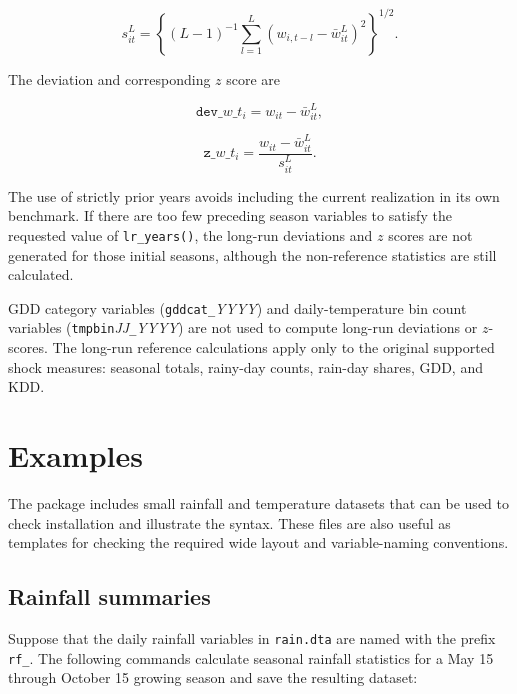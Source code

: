 \begin{equation}
	s_{it}^{L} = \left\{(L - 1)^{-1} \sum_{l = 1}^{L} \left(w_{i, t - l} - \bar{w}_{it}^{L} \right)^2 \right\}^{1 / 2} .
\end{equation}

The deviation and corresponding $z$ score are

\begin{equation}
	\texttt{dev\_} w\texttt{\_} t_i = w_{it} - \bar{w}_{it}^{L} ,
\end{equation}

\begin{equation}
	\texttt{z\_} w\texttt{\_} t_i = \frac{w_{it} - \bar{w}_{it}^{L}}{s_{it}^{L}} .
\end{equation}

\noindent The use of strictly prior years avoids including the current realization in its own benchmark. If there are too few preceding season variables to satisfy the requested value of \texttt{lr\_years()}, the long-run deviations and $z$ scores are not generated for those initial seasons, although the non-reference statistics are still calculated.

GDD category variables (\texttt{gddcat\_}\textit{YYYY}) and daily-temperature bin count variables (\texttt{tmpbin}\textit{JJ}\texttt{\_}\textit{YYYY}) are not used to compute long-run deviations or $z$-scores. The long-run reference calculations apply only to the original supported shock measures: seasonal totals, rainy-day counts, rain-day shares, GDD, and KDD.

\section{Examples}

The package includes small rainfall and temperature datasets that can be used to check installation and illustrate the syntax. These files are also useful as templates for checking the required wide layout and variable-naming conventions. 

\subsection{Rainfall summaries}

Suppose that the daily rainfall variables in \texttt{rain.dta} are named with the prefix \texttt{rf\_}. The following commands calculate seasonal rainfall statistics for a May 15 through October 15 growing season and save the resulting dataset:

